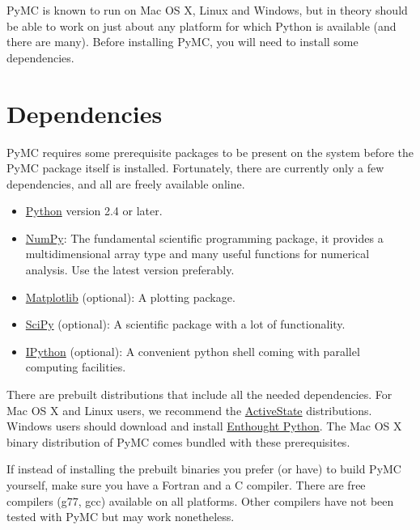 


PyMC is known to run on Mac OS X, Linux and Windows, but in theory should be
able to work on just about any platform for which Python is available (and
there are many). Before installing PyMC, you will need to install some
dependencies.



\hypertarget{dependencies}{}
\section*{Dependencies}

PyMC requires some prerequisite packages to be present on the system before the
PyMC package itself is installed. Fortunately, there are currently only a few
dependencies, and all are freely available online.
\begin{itemize}
\item {} 
\href{http://www.python.org/.}{Python} version 2.4 or later.

\item {} 
\href{http://www.scipy.org/NumPy}{NumPy}: The fundamental scientific programming package, it provides a
multidimensional array type and many useful functions for numerical analysis.
Use the latest version preferably.

\item {} 
\href{http://matplotlib.sourceforge.net/}{Matplotlib} (optional): A plotting package.

\item {} 
\href{http://www.scipy.org/}{SciPy} (optional): A scientific package with a lot of functionality.

\item {} 
\href{http://ipython.scipy.org/}{IPython} (optional): A convenient python shell coming with parallel
computing facilities.

\end{itemize}

There are prebuilt distributions that include all the needed dependencies. For
Mac OS X and Linux users, we recommend the \href{http://www.activestate.com/Products/ActivePython/}{ActiveState} distributions.
Windows users should download and install \href{http://code.enthought.com/enthon/}{Enthought Python}. The Mac OS X
binary distribution of PyMC comes bundled with these prerequisites.

If instead of installing the prebuilt binaries you prefer (or have) to build PyMC
yourself, make sure you have a Fortran and a C compiler. There are free
compilers (g77, gcc) available on all platforms. Other compilers have not been
tested with PyMC but may work nonetheless.


